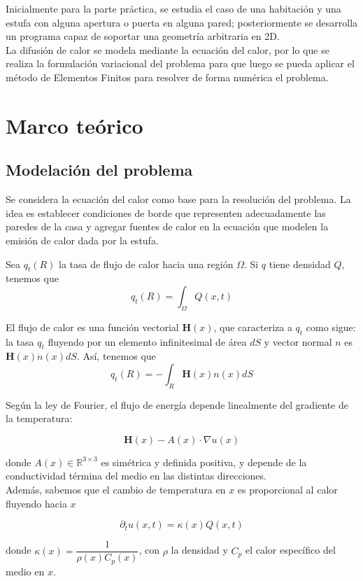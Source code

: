 \documentclass[12pt,paperletter]{article}
\newcommand{\R}{\mathbb{R}}
\newcommand{\h}{\mathbf{H}}
\renewcommand{\O}{\Omega}
\begin{document}
Inicialmente para la parte práctica, se estudia el caso de una habitación y una estufa con alguna apertura o puerta en alguna pared; posteriormente se desarrolla un programa capaz de soportar una geometría arbitraria en 2D.\\

La difusión de calor se modela mediante la ecuación del calor, por lo que se realiza la formulación variacional del problema para que luego se pueda aplicar el método de Elementos Finitos para resolver de forma numérica el problema.

\newpage
\section{Marco teórico}

\subsection{Modelación del problema}
Se considera la ecuación del calor como base para la resolución del problema. La idea es establecer condiciones de borde que representen adecuadamente las paredes de la casa y agregar fuentes de calor en la ecuación que modelen la emisión de calor dada por la estufa. 

Sea $q_t(R)$ la tasa de flujo de calor hacia una región $\O$. Si $q$ tiene densidad $Q$, tenemos que $$q_t(R) = \int_\O Q(x,t)$$

El flujo de calor es una función vectorial $\mathbf{H}(x)$, que caracteriza a $q_t$ como sigue: la tasa $q_t$ fluyendo por un elemento infinitesimal de área $dS$ y vector normal $n$ es $\h(x) \dot n(x) dS$. Así, tenemos que 
$$q_t(R) = -\int_R \h(x)n(x)dS$$

Según la ley de Fourier, el flujo de energía depende linealmente del gradiente de la temperatura:

$$\h(x) - A(x)\cdot \nabla u(x)$$

donde $A(x) \in \R^{3\times3}$ es simétrica y definida positiva, y depende de la conductividad términa del medio en las distintas direcciones.\\

Además, sabemos que el cambio de temperatura en $x$ es proporcional al calor fluyendo hacia $x$

$$\partial_t u(x,t) = \kappa(x) Q(x,t)$$

donde $\kappa(x) = \dfrac{1}{\rho(x) C_p(x)}$, con $\rho$ la densidad y $C_p$ el calor específico del medio en $x$.
\end{document}
